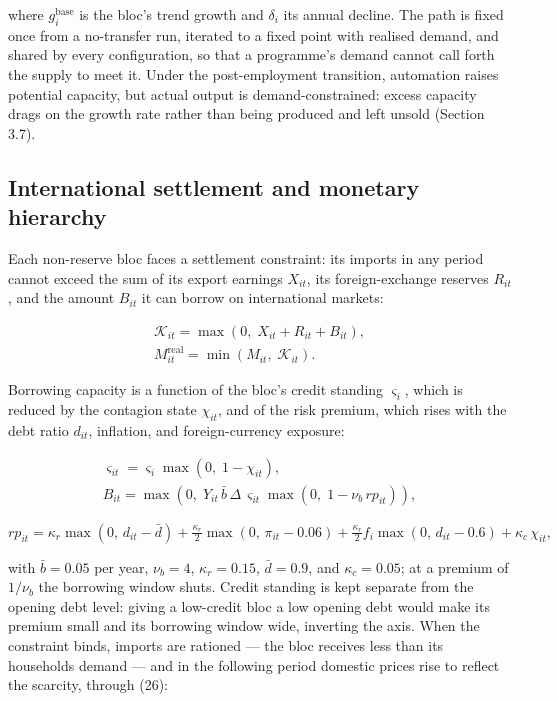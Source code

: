 \documentclass[preprint,review,12pt]{elsarticle}
\begin{document}
where \(g^{\mathrm{base}}_i\) is the bloc's trend growth and
\(\delta_i\) its annual decline. The path is fixed once from a
no-transfer run, iterated to a fixed point with realised demand, and
shared by every configuration, so that a programme's demand cannot call
forth the supply to meet it. Under the post-employment transition,
automation raises potential capacity, but actual output is
demand-constrained: excess capacity drags on the growth rate rather than
being produced and left unsold (Section 3.7).

\subsection{International settlement and monetary hierarchy}

Each non-reserve bloc faces a settlement constraint: its imports in any
period cannot exceed the sum of its export earnings \(X_{it}\), its
foreign-exchange reserves \(R_{it}\), and the amount \(B_{it}\) it can
borrow on international markets:

\[\begin{gathered} \mathcal{K}_{it} = \max\left( 0,\; X_{it} + R_{it} + B_{it} \right), \\ M^{\mathrm{real}}_{it} = \min\left( M_{it},\; \mathcal{K}_{it} \right). \end{gathered} \tag{29}\]

Borrowing capacity is a function of the bloc's credit standing
\(\varsigma_i\), which is reduced by the contagion state \(\chi_{it}\),
and of the risk premium, which rises with the debt ratio \(d_{it}\),
inflation, and foreign-currency exposure:

\[\begin{gathered} \varsigma_{it} = \varsigma_i \max\left( 0,\; 1 - \chi_{it} \right), \\ B_{it} = \max\left( 0,\; Y_{it} \, \bar{b} \, \Delta \, \varsigma_{it} \max\left( 0,\; 1 - \nu_b \, rp_{it} \right) \right), \end{gathered} \tag{30}\]

\[rp_{it} = \kappa_r \max(0,\, d_{it} - \bar{d}) + \tfrac{\kappa_r}{2} \max(0,\, \pi_{it} - 0.06) + \tfrac{\kappa_r}{2} f_i \max(0,\, d_{it} - 0.6) + \kappa_c \, \chi_{it}, \tag{31}\]

with \(\bar{b} = 0.05\) per year, \(\nu_b = 4\), \(\kappa_r = 0.15\),
\(\bar{d} = 0.9\), and \(\kappa_c = 0.05\); at a premium of \(1/\nu_b\)
the borrowing window shuts. Credit standing is kept separate from the
opening debt level: giving a low-credit bloc a low opening debt would
make its premium small and its borrowing window wide, inverting the
axis. When the constraint binds, imports are rationed --- the bloc
receives less than its households demand --- and in the following period
domestic prices rise to reflect the scarcity, through (26):
\end{document}
